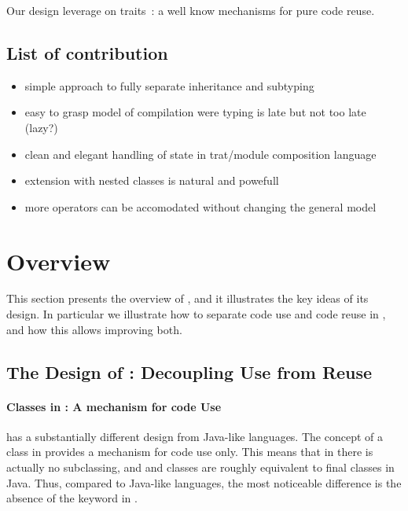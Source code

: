 Our design leverage on traits~\cite{ducasse2006traits}: a well know mechanisms for pure
code reuse.


\subsection{List of contribution}
\begin{itemize}
\item simple approach to fully separate inheritance and subtyping
\item easy to grasp model of compilation were typing is late but not
  too late (lazy?)
\item clean and elegant handling of state in trat/module composition language
\item extension with nested classes is natural and
  powefull
\item more operators can be accomodated without changing the general model
\end{itemize}

\section{Overview}

This section presents the overview of \name, and it illustrates the
key ideas of its design. In particular we illustrate how to separate code use and 
code reuse in \name, and how this allows improving both. 

\subsection{The Design of \name: Decoupling Use from Reuse}

\paragraph{Classes in \name: A mechanism for code Use}
\name has a substantially different design from Java-like languages.
The concept of a class in \name provides a mechanism for code use
only. This means that in \name there is actually no subclassing, and
and classes are roughly equivalent to final classes in Java.  Thus,
compared to Java-like languages, the most noticeable difference is the
absence of the \Q@extends@ keyword in \name. 

